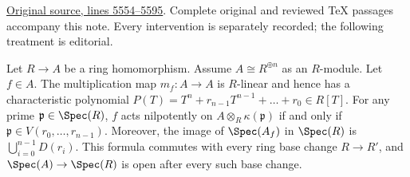 \noindent\href{https://github.com/stacks/stacks-project/blob/a04446e57ec1fbc252a871afcec7752fb2807b14/algebra.tex\#L5554}{Original source, lines 5554--5595}. Complete original and reviewed TeX passages accompany this note. Every intervention is separately recorded; the following treatment is editorial.


\begin{lemma}
\label{editorial-source-lemma-characteristic-polynomial-prime}
Let $R \to A$ be a ring homomorphism.
Assume $A \cong R^{\oplus n}$ as an $R$-module.
Let $f \in A$. The multiplication map $m_f: A
\to A$ is $R$-linear and hence
has a characteristic polynomial
$P(T) = T^n + r_{n-1}T^{n-1} + \ldots + r_0 \in R[T]$.
For any prime
$\mathfrak{p} \in \Spec(R)$, $f$ acts nilpotently on $A
\otimes_R \kappa(\mathfrak{p})$ if and only if $\mathfrak p \in
V(r_0, \ldots, r_{n-1})$.
Moreover, the image of $\Spec(A_f)$ in $\Spec(R)$ is
$\bigcup_{i=0}^{n-1}D(r_i)$. This formula commutes with every ring
base change $R\to R'$, and $\Spec(A)\to\Spec(R)$ is open after every
such base change.
\end{lemma}

